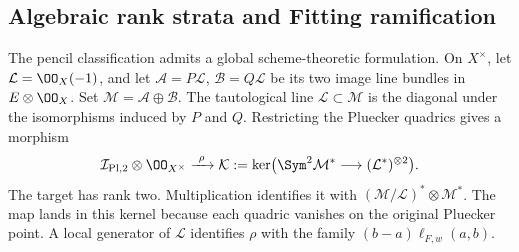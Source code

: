\subsection{Algebraic rank strata and Fitting ramification}
\label{sec:global-pencil-strata}

The pencil classification admits a global scheme-theoretic formulation.
On \(X^\times\), let \(\mathcal L=\OO_X(-1)\), and let
\(\mathcal A=P\mathcal L\), \(\mathcal B=Q\mathcal L\)
be its two image line bundles in \(E\otimes\OO_X\).  Set
\(\mathcal M=\mathcal A\oplus\mathcal B\).  The tautological
line \(\mathcal L\subset\mathcal M\) is the diagonal under
the isomorphisms induced by \(P\) and \(Q\).  Restricting the
Pluecker quadrics gives a morphism
\begin{equation}\label{eq:global-pencil-bundle-morphism}
 \mathcal I_{\mathrm{Pl},2}\otimes\OO_{X^\times}
 \xrightarrow{\ \rho\ }
 \mathcal K:=\ker\bigl(\Sym^2\mathcal M^*
                         \longrightarrow(\mathcal L^*)^{\otimes2}\bigr).
\end{equation}
The target has rank two.  Multiplication identifies it with
\((\mathcal M/\mathcal L)^*\otimes\mathcal M^*\).
The map lands in this kernel because each quadric vanishes on the
original Pluecker point.  A local generator of \(\mathcal L\)
identifies \(\rho\) with the family
\((b-a)\ell_{F,w}(a,b)\).



